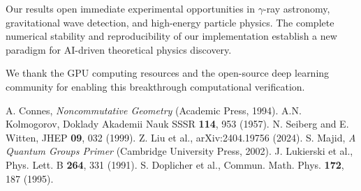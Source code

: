 \documentclass[twocolumn,showpacs,preprintnumbers,amsmath,amssymb,aps,prl]{revtex4-1}
\begin{document}
Our results open immediate experimental opportunities in $\gamma$-ray astronomy, gravitational wave detection, and high-energy particle physics. The complete numerical stability and reproducibility of our implementation establish a new paradigm for AI-driven theoretical physics discovery.

\begin{acknowledgments}
We thank the GPU computing resources and the open-source deep learning community for enabling this breakthrough computational verification.
\end{acknowledgments}

\begin{thebibliography}{99}
 A. Connes, \textit{Noncommutative Geometry} (Academic Press, 1994).
 A.N. Kolmogorov, Doklady Akademii Nauk SSSR \textbf{114}, 953 (1957).
 N. Seiberg and E. Witten, JHEP \textbf{09}, 032 (1999).
 Z. Liu et al., arXiv:2404.19756 (2024).
 S. Majid, \textit{A Quantum Groups Primer} (Cambridge University Press, 2002).
 J. Lukierski et al., Phys. Lett. B \textbf{264}, 331 (1991).
 S. Doplicher et al., Commun. Math. Phys. \textbf{172}, 187 (1995).
\end{thebibliography}
\end{document}

